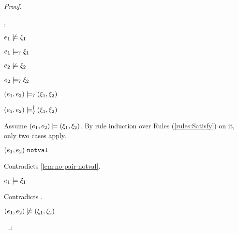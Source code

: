 \begin{proof}
\begin{byCases}
\begin{byCases}
\begin{byCases}
        \item[\cmaysatisfy{e_1}{\xi_1},\cmaysatisfy{e_2}{\xi_2}]
            \begin{pfsteps*}
            \item $e_1 \not\models \xi_1$  
            \item $e_1 \models_{?} \xi_1$  
            \item $e_2 \not\models \xi_2$  
            \item $e_2 \models_{?} \xi_2$  
            \item $(e_1 , e_2) \models_{?} (\xi_1 , \xi_2)$  
            \item $(e_1 , e_2) \models_{?}^{\dag} (\xi_1 , \xi_2)$ 
            \end{pfsteps*}
            Assume $(e_1 , e_2) \models (\xi_1 , \xi_2)$. By rule induction over Rules (\ref{rules:Satisfy}) on it, only two cases apply. 
           \begin{byCases}
            \item[\text{(\ref{rule:CSNotValPair})}]
                \begin{pfsteps*}
                \item $(e_1 , e_2) ~\mathtt{notval}$ 
                \end{pfsteps*}
                Contradicts \autoref{lem:no-pair-notval}.
            \item[\text{(\ref{rule:CSPair})}]
                \begin{pfsteps*}
                \item $e_1 \models \xi_1$ 
                \end{pfsteps*}
                Contradicts .
            \end{byCases}
            \begin{pfsteps*}
            \item $(e_1 , e_2) \not\models (\xi_1 , \xi_2)$  
            \end{pfsteps*}
            

\end{byCases}
\end{byCases}
\end{byCases}
\end{proof}
